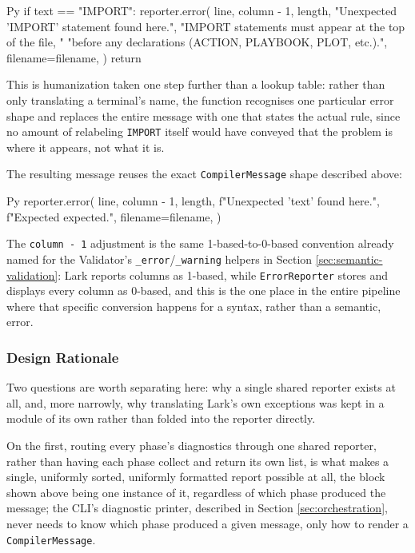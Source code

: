 \begin{codeblock}[]{Py}
if text == "IMPORT":
    reporter.error(
        line, column - 1, length,
        "Unexpected 'IMPORT' statement found here.",
        "IMPORT statements must appear at the top of the file, "
        "before any declarations (ACTION, PLAYBOOK, PLOT, etc.).",
        filename=filename,
    )
    return

This is humanization taken one step further than a lookup table: rather than only translating a terminal's name, the function recognises one particular error shape and replaces the entire message with one that states the actual rule, since no amount of relabeling \lstinline|IMPORT| itself would have conveyed that the problem is where it appears, not what it is.

The resulting message reuses the exact \lstinline|CompilerMessage| shape described above:
\begin{codeblock}[]{Py}
reporter.error(
    line, column - 1, length,
    f"Unexpected '{text}' found here.",
    f"Expected {expected}.",
    filename=filename,
)
\end{codeblock}

The \lstinline|column - 1| adjustment is the same 1-based-to-0-based convention already named for the Validator's \lstinline|_error|/\lstinline|_warning| helpers in Section \ref{sec:semantic-validation}: Lark reports columns as 1-based, while \lstinline|ErrorReporter| stores and displays every column as 0-based, and this is the one place in the entire pipeline where that specific conversion happens for a syntax, rather than a semantic, error.

\subsubsection{Design Rationale}
Two questions are worth separating here: why a single shared reporter exists at all, and, more narrowly, why translating Lark's own exceptions was kept in a module of its own rather than folded into the reporter directly.

On the first, routing every phase's diagnostics through one shared reporter, rather than having each phase collect and return its own list, is what makes a single, uniformly sorted, uniformly formatted report possible at all, the block shown above being one instance of it, regardless of which phase produced the message; the CLI's diagnostic printer, described in Section \ref{sec:orchestration}, never needs to know which phase produced a given message, only how to render a \lstinline|CompilerMessage|.


\end{codeblock}
